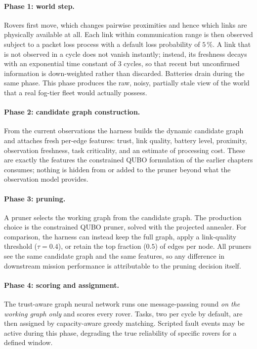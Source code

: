 \paragraph{Phase 1: world step.} Rovers first move, which changes pairwise
proximities and hence which links are physically available at all. Each
link within communication range is then observed subject to a packet loss
process with a default loss probability of $5\,\%$. A link that is not
observed in a cycle does not vanish instantly; instead, its freshness
decays with an exponential time constant of $3$ cycles, so that recent but
unconfirmed information is down-weighted rather than discarded. Batteries
drain during the same phase. This phase produces the raw, noisy,
partially stale view of the world that a real fog-tier fleet would
actually possess.

\paragraph{Phase 2: candidate graph construction.} From the current
observations the harness builds the dynamic candidate graph and attaches
fresh per-edge features: trust, link quality, battery level, proximity,
observation freshness, task criticality, and an estimate of processing
cost. These are exactly the features the constrained QUBO formulation of
the earlier chapters consumes; nothing is hidden from or added to the
pruner beyond what the observation model provides.

\paragraph{Phase 3: pruning.} A pruner selects the working graph from the
candidate graph. The production choice is the constrained QUBO pruner,
solved with the projected annealer. For comparison, the harness can
instead keep the full graph, apply a link-quality threshold
($\tau = 0.4$), or retain the top fraction ($0.5$) of edges per node.
All pruners see the same candidate graph and the same features, so any
difference in downstream mission performance is attributable to the
pruning decision itself.

\paragraph{Phase 4: scoring and assignment.} The trust-aware graph neural
network runs one message-passing round \emph{on the working graph only}
and scores every rover. Tasks, two per cycle by default, are then
assigned by capacity-aware greedy matching. Scripted fault events may be
active during this phase, degrading the true reliability of specific
rovers for a defined window.

